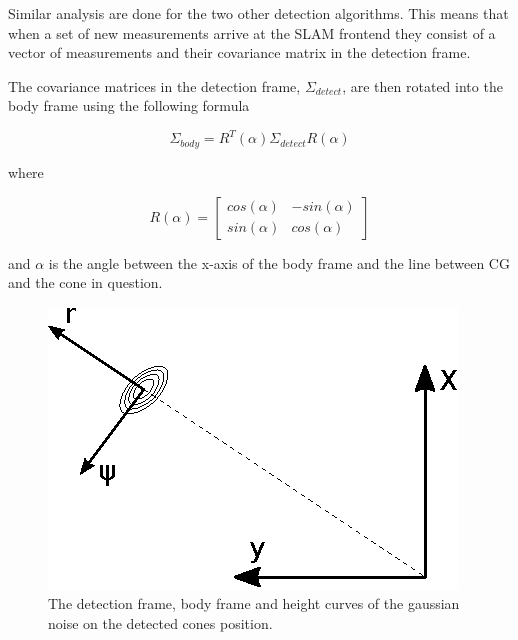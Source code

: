 Similar analysis are done for the two other detection algorithms. This means that when a set of new measurements arrive at the SLAM frontend they consist of a vector of measurements and their covariance matrix in the detection frame. 

The covariance matrices in the detection frame, $\Sigma_{detect}$, are then rotated into the body frame using the following formula

\begin{equation}
    \Sigma_{body} = R^T(\alpha)\Sigma_{detect}R(\alpha)
    \label{DetectToBodyRot}
\end{equation}

where 

\begin{equation}
    R(\alpha) = \begin{bmatrix} cos(\alpha) & -sin(\alpha) \\ sin(\alpha) & cos(\alpha)
    \end{bmatrix}
\end{equation} 

and $\alpha$ is the angle between the x-axis of the body frame and the line between CG and the cone in question. 

\begin{figure}
    \centering
    \includegraphics[width=0.5\linewidth]{0_Images/3_Theory/DetectionFrame.eps}
    \caption[The detection frame.]{The detection frame, body frame and height curves of the gaussian noise on the detected cones position.}
    \label{Fig:DetectionFrame}
\end{figure}

